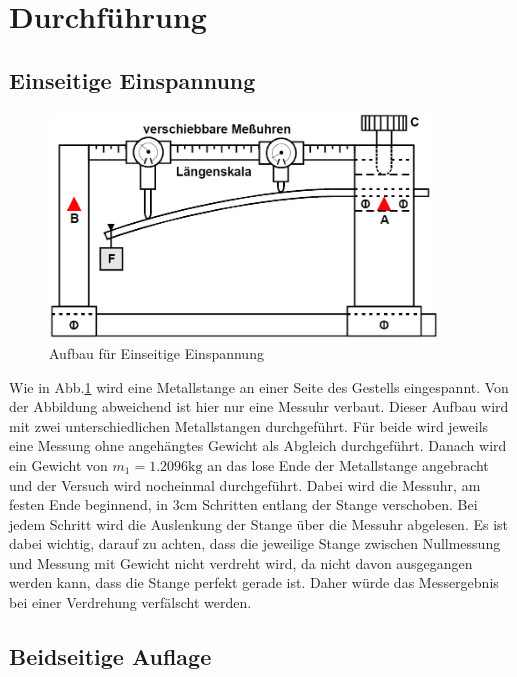 \section{Durchführung}
\label{sec:Durchführung}

\subsection{Einseitige Einspannung}
\begin{figure}
    \centering
    \includegraphics[height=6cm]{data/bild_3}
    \caption{Aufbau für Einseitige Einspannung}
    \label{fig:aufbau1}
\end{figure}

Wie in Abb.\ref{fig:aufbau1} wird eine Metallstange an einer Seite des Gestells eingespannt. Von der Abbildung abweichend ist hier nur eine Messuhr
verbaut. Dieser Aufbau wird mit zwei unterschiedlichen Metallstangen durchgeführt. Für beide wird jeweils eine Messung ohne angehängtes
Gewicht als Abgleich durchgeführt. Danach wird ein Gewicht von  $m_1 = 1.2096 \si{\kilo\gram}$ an das lose Ende der Metallstange angebracht und 
der Versuch wird nocheinmal durchgeführt. Dabei wird die Messuhr, am festen Ende beginnend, in 3$\si{\centi\meter}$ Schritten entlang der 
Stange verschoben. Bei jedem Schritt wird die Auslenkung der Stange über die Messuhr abgelesen. Es ist dabei wichtig, darauf zu achten,
dass die jeweilige Stange zwischen Nullmessung und Messung mit Gewicht nicht verdreht wird, da nicht davon ausgegangen werden kann, dass 
die Stange perfekt gerade ist. Daher würde das Messergebnis bei einer Verdrehung verfälscht werden. 

\subsection{Beidseitige Auflage}


